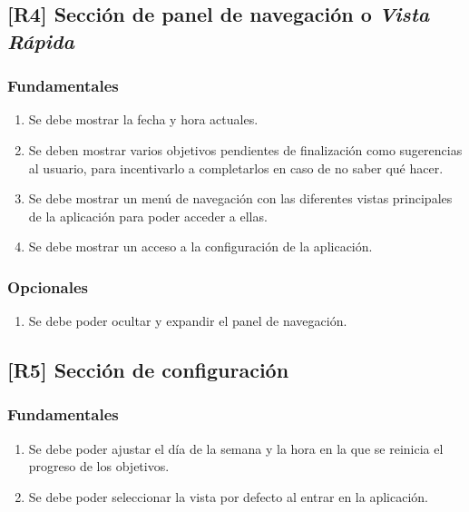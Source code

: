 \documentclass[10pt, a4paper]{aqademic}
\begin{document}
\subsection*{[R4] Sección de panel de navegación o \textit{Vista Rápida}}

\subsubsection*{Fundamentales}

\begin{enumerate}[label=\textbf{R4.\arabic*f}, leftmargin=10mm]
	\item Se debe mostrar la fecha y hora actuales.
	
	\item Se deben mostrar varios objetivos pendientes de finalización como sugerencias al usuario, para incentivarlo a completarlos en caso de no saber qué hacer.
	
	\item Se debe mostrar un menú de navegación con las diferentes vistas principales de la aplicación para poder acceder a ellas.
	
	\item Se debe mostrar un acceso a la configuración de la aplicación.
\end{enumerate}

\subsubsection*{Opcionales}

\begin{enumerate}[label=\textbf{R4.\arabic*o}, leftmargin=10mm]
	\item Se debe poder ocultar y expandir el panel de navegación.
\end{enumerate}


\subsection*{[R5] Sección de configuración}

\subsubsection*{Fundamentales}

\begin{enumerate}[label=\textbf{R5.\arabic*f}, leftmargin=10mm]
	\item Se debe poder ajustar el día de la semana y la hora en la que se reinicia el progreso de los objetivos.
	
	\item Se debe poder seleccionar la vista por defecto al entrar en la aplicación.
\end{enumerate}
\end{document}
